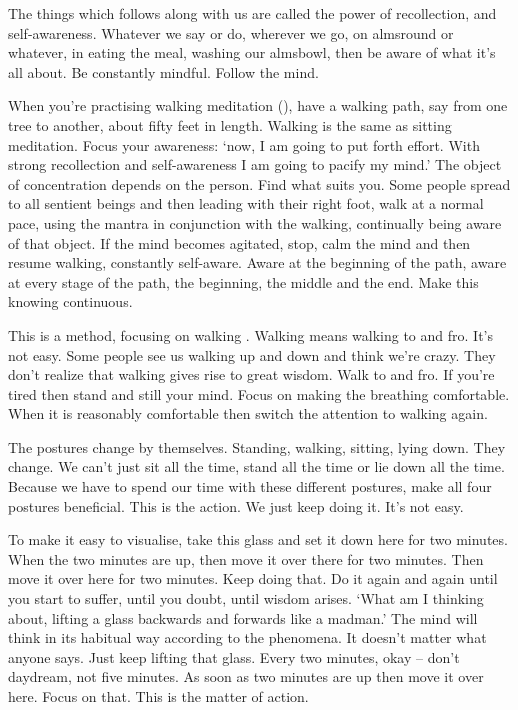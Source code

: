The things which follows along with us are called  the power of recollection, and  self-awareness. Whatever we say or do, wherever we go, on almsround or whatever, in eating the meal, washing our almsbowl, then be aware of what it's all about. Be constantly mindful. Follow the mind.

When you're practising walking meditation (), have a walking path, say from one tree to another, about fifty feet in length. Walking  is the same as sitting meditation. Focus your awareness: `now, I am going to put forth effort. With strong recollection and self-awareness I am going to pacify my mind.' The object of concentration depends on the person. Find what suits you. Some people spread  to all sentient beings and then leading with their right foot, walk at a normal pace, using the mantra  in conjunction with the walking, continually being aware of that object. If the mind becomes agitated, stop, calm the mind and then resume walking, constantly self-aware. Aware at the beginning of the path, aware at every stage of the path, the beginning, the middle and the end. Make this knowing continuous.

This is a method, focusing on walking . Walking  means walking to and fro. It's not easy. Some people see us walking up and down and think we're crazy. They don't realize that walking  gives rise to great wisdom. Walk to and fro. If you're tired then stand and still your mind. Focus on making the breathing comfortable. When it is reasonably comfortable then switch the attention to walking again.

The postures change by themselves. Standing, walking, sitting, lying down. They change. We can't just sit all the time, stand all the time or lie down all the time. Because we have to spend our time with these different postures, make all four postures beneficial. This is the action. We just keep doing it. It's not easy.

To make it easy to visualise, take this glass and set it down here for two minutes. When the two minutes are up, then move it over there for two minutes. Then move it over here for two minutes. Keep doing that. Do it again and again until you start to suffer, until you doubt, until wisdom arises. `What am I thinking about, lifting a glass backwards and forwards like a madman.' The mind will think in its habitual way according to the phenomena. It doesn't matter what anyone says. Just keep lifting that glass. Every two minutes, okay -- don't daydream, not five minutes. As soon as two minutes are up then move it over here. Focus on that. This is the matter of action.

